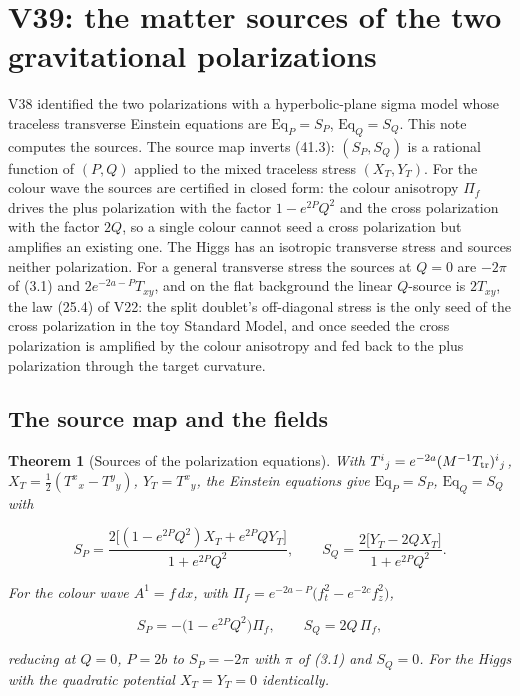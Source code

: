 \documentclass[11pt]{article}
\newtheorem{theorem}{Theorem}[section]
\theoremstyle{remark}
\begin{document}
\section{V39: the matter sources of the two gravitational polarizations}
\label{sec:v20v39}

V38 identified the two polarizations with a hyperbolic-plane sigma
model whose traceless transverse Einstein equations are
\(\mathrm{Eq}_P=S_P\), \(\mathrm{Eq}_Q=S_Q\).  This note computes the
sources.  The source map inverts (41.3): \((S_P,S_Q)\) is a rational
function of \((P,Q)\) applied to the mixed traceless stress
\((X_T,Y_T)\).  For the colour wave the sources are certified in closed
form: the colour anisotropy \(\Pi_f\) drives the plus polarization
with the factor \(1-e^{2P}Q^2\) and the cross polarization with the
factor \(2Q\), so a single colour cannot seed a cross polarization
but amplifies an existing one.  The Higgs has an isotropic
transverse stress and sources neither polarization.  For a general
transverse stress the sources at \(Q=0\) are \(-2\pi\) of (3.1) and
\(2e^{-2a-P}T_{xy}\), and on the flat background the linear
\(Q\)-source is \(2T_{xy}\), the law (25.4) of V22: the split
doublet's off-diagonal stress is the only seed of the cross
polarization in the toy Standard Model, and once seeded the cross
polarization is amplified by the colour anisotropy and fed back to
the plus polarization through the target curvature.

\subsection{The source map and the fields}

\begin{theorem}[Sources of the polarization equations]
\label{thm:v20v39-map}
With \(T^i{}_j=e^{-2a}(M^{-1}T_{\rm tr})^i{}_j\), \(X_T=\tfrac12(T^x{}_x-T^y{}_y)\),
\(Y_T=T^x{}_y\), the Einstein equations give \(\mathrm{Eq}_P=S_P\),
\(\mathrm{Eq}_Q=S_Q\) with

\[
 S_P=\frac{2\bigl[(1-e^{2P}Q^2)X_T+e^{2P}QY_T\bigr]}{1+e^{2P}Q^2},\qquad
 S_Q=\frac{2\bigl[Y_T-2QX_T\bigr]}{1+e^{2P}Q^2}.                         \tag{42.1}
\]

For the colour wave \(A^1=f\,dx\), with
\(\Pi_f=e^{-2a-P}\bigl(f_t^2-e^{-2c}f_z^2\bigr)\),

\[
 S_P=-\bigl(1-e^{2P}Q^2\bigr)\Pi_f,\qquad S_Q=2Q\,\Pi_f,               \tag{42.2}
\]

reducing at \(Q=0\), \(P=2b\) to \(S_P=-2\pi\) with \(\pi\) of (3.1) and
\(S_Q=0\).  For the Higgs with the quadratic potential
\(X_T=Y_T=0\) identically.
\end{theorem}
\end{document}
